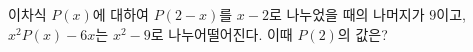 이차식 $P(x)$에 대하여 $P(2-x)$를 $x-2$로 나누었을 때의 나머지가 $9$이고, $x^2P(x)-6x$는 $x^2-9$로 나누어떨어진다. 이때 $P(2)$의 값은?
